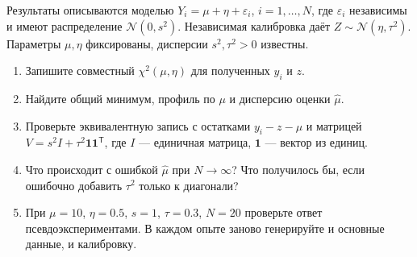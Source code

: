 \documentclass[
  russian,
  11pt,
  a4paper,
  open=any]{scrbook}
\providecommand{\tightlist}{%
  \setlength{\itemsep}{0pt}\setlength{\parskip}{0pt}}
\begin{document}
\begin{semanticpdfbox}[colback=BookCoralSoft,borderline west={1.2mm}{0pt}{BookCoral}]

\par\nopagebreak[4]\vspace{1.2mm}

Результаты описываются моделью \(Y_i=\mu+\eta+\varepsilon_i\),
\(i=1,\ldots,N\), где \(\varepsilon_i\) независимы и имеют распределение
\(\mathcal N(0,s^2)\). Независимая калибровка даёт
\(Z\sim\mathcal N(\eta,\tau^2)\). Параметры \(\mu,\eta\) фиксированы,
дисперсии \(s^2,\tau^2>0\) известны.

\begin{enumerate}
\def\labelenumi{\arabic{enumi}.}
\tightlist
\item
  Запишите совместный \(\chi^2(\mu,\eta)\) для полученных \(y_i\) и
  \(z\).
\item
  Найдите общий минимум, профиль по \(\mu\) и дисперсию оценки
  \(\widehat\mu\).
\item
  Проверьте эквивалентную запись с остатками \(y_i-z-\mu\) и матрицей
  \(V=s^2I+\tau^2\mathbf1\mathbf1^{\mathsf T}\), где \(I\) --- единичная
  матрица, \(\mathbf1\) --- вектор из единиц.
\item
  Что происходит с ошибкой \(\widehat\mu\) при \(N\to\infty\)? Что
  получилось бы, если ошибочно добавить \(\tau^2\) только к диагонали?
\item
  При \(\mu=10\), \(\eta=0.5\), \(s=1\), \(\tau=0.3\), \(N=20\)
  проверьте ответ псевдоэкспериментами. В каждом опыте заново
  генерируйте и основные данные, и калибровку.
\end{enumerate}

\end{semanticpdfbox}
\end{document}
